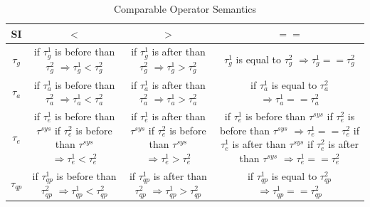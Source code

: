 \begin{table}[!htbp]
	\centering
	\caption{Comparable Operator Semantics}
	\label{tab:cos}
	\begin{tabular}{|c|c|c|c|} \hline
		SI & $<$ & $>$ & $==$ \\ \hline
        $\tau_{g}$ & \makecell{if $\tau^{1}_{g}$ is before than $\tau^{2}_{g}$ \\ $\Rightarrow \tau^{1}_{g} < \tau^{2}_{g}$} & \makecell{if $\tau^{1}_{g}$ is after than $\tau^{2}_{g}$ \\ $\Rightarrow \tau^{1}_{g} > \tau^{2}_{g}$} & \makecell{$\tau^{1}_{g}$ is equal to $\tau^{2}_{g}$ \\ $\Rightarrow \tau^{1}_{g} == \tau^{2}_{g}$} \\ \hhline{|=#=|=|=|}
		$\tau_{a}$ & \makecell{if $\tau^{1}_{a}$ is before than $\tau^{2}_{a}$ \\ $\Rightarrow \tau^{1}_{a} < \tau^{2}_{a}$} & \makecell{if $\tau^{1}_{a}$ is after than $\tau^{2}_{a}$ \\$\Rightarrow \tau^{1}_{a} > \tau^{2}_{a}$} & \makecell{if $\tau^{1}_{a}$ is equal to $\tau^{2}_{a}$ \\$\Rightarrow \tau^{1}_{a} == \tau^{2}_{a}$} \\ \hline
		$\tau_{e}$ & \makecell{if $\tau^{1}_{e}$ is before than $\tau^{sys}$ \\ if $\tau^{2}_{e}$ is before than $\tau^{sys}$ \\$\Rightarrow \tau^{1}_{e} < \tau^{2}_{e}$}& \makecell{if $\tau^{1}_{e}$ is after than $\tau^{sys}$ \\ if $\tau^{2}_{e}$ is before than $\tau^{sys}$\\$\Rightarrow \tau^{1}_{e} > \tau^{2}_{e}$} & \makecell{if $\tau^{1}_{e}$ is before than $\tau^{sys}$ \\ if $\tau^{2}_{e}$ is before than $\tau^{sys}$ \\ $\Rightarrow \tau^{1}_{e} == \tau^{2}_{e}$ \\if $\tau^{1}_{e}$ is after than $\tau^{sys}$\\if $\tau^{2}_{e}$ is after than $\tau^{sys}$\\$\Rightarrow \tau^{1}_{e} == \tau^{2}_{e}$} \\ \hline
        $\tau_{qp}$ & \makecell{if $\tau^{1}_{qp}$ is before than $\tau^{2}_{qp}$\\ $\Rightarrow \tau^{1}_{qp} < \tau^{2}_{qp}$} & \makecell{if $\tau^{1}_{qp}$ is after than $\tau^{2}_{qp}$ \\ $\Rightarrow \tau^{1}_{qp} > \tau^{2}_{qp}$} & \makecell{if $\tau^{1}_{qp}$ is equal to $\tau^{2}_{qp}$ \\ $\Rightarrow \tau^{1}_{qp} == \tau^{2}_{qp}$} \\ \hline

\end{tabular}
\end{table}
